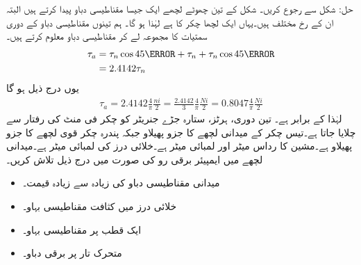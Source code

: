 حل: \quad
شکل   سے رجوع کریں۔ شکل  کے تین چھوٹے لچھے ایک جیسا  مقناطیسی دباو  پیدا کرتے ہیں البتہ ان کے رخ مختلف ہیں۔یہاں ایک لچھا   چکر کا ہے لہٰذا  ہو گا۔ ہم تینوں مقناطیسی دباو کے دوری سمتیات کا مجموعہ لے کر  مقناطیسی دباو  معلوم کرتے ہیں۔
\begin{align*}
\tau_a&=\tau_n \cos 45\degree+\tau_n+\tau_n \cos 45\degree\\
&=2.4142 \tau_n
\end{align*}
یوں درج ذیل ہو گا
\begin{align*}
\tau_a=2.4142 \frac{4}{\pi}\frac{ni}{2}=\frac{2.4142}{3} \frac{4}{\pi}\frac{N i}{2}=0.8047 \frac{4}{\pi}\frac{N i}{2}
\end{align*}
لہٰذا  کے برابر ہے۔
%
تین دوری،  ہرٹز، ستارہ جڑے جنریٹر کو   چکر فی منٹ کی رفتار سے چلایا جاتا ہے۔تیس چکر کے میدانی لچھے  کا جزو پھیلاو  جبکہ پندرہ چکر قوی لچھے کا جزو پھیلاو  ہے۔مشین کا رداس  میٹر اور لمبائی  میٹر ہے۔خلائی درز کی لمبائی  میٹر ہے۔میدانی لچھے میں   ایمپیئر برقی رو کی صورت میں درج ذیل تلاش کریں۔
\begin{itemize}
\item
میدانی مقناطیسی دباو کی زیادہ سے زیادہ قیمت۔
\item
خلائی درز میں کثافت مقناطیسی بہاو۔
\item
ایک قطب پر مقناطیسی بہاو۔
\item
متحرک تار پر برقی دباو۔
\end{itemize}

